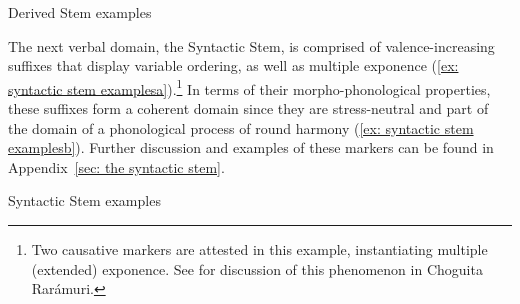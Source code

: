 \ea\label{ex: derived stem examples}
{Derived Stem examples}

    \label{ex: derived stem examplesa}
        \label{ex: derived stem examplesb}
    \z
\z

\hspace*{-.3pt}The next verbal domain, the Syntactic Stem, is comprised of valence-increasing suffixes that display variable ordering, as well as multiple exponence (\ref{ex: syntactic stem examplesa}).\footnote{Two causative markers are attested in this example, instantiating multiple (extended) exponence. See \citet{caballero2011multiple} for discussion of this phenomenon in Choguita Rarámuri.} In terms of their morpho-phonological properties, these suffixes form a coherent domain since they are stress-neutral and part of the domain of a phonological process of round harmony (\ref{ex: syntactic stem examplesb}). Further discussion and examples of these markers can be found in Appendix~\ref{sec: the syntactic stem}.

\ea\label{ex: syntactic stem examples}
{Syntactic Stem examples}

    \label{ex: syntactic stem examplesa}
    \label{ex: syntactic stem examplesb}
    \z
\z

